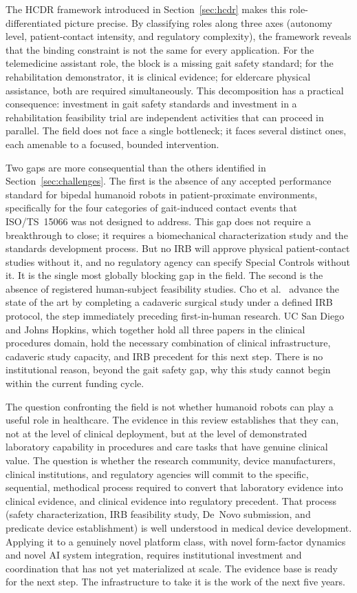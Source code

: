 \documentclass[acmjour]{acmart}
\begin{document}
The HCDR framework introduced in Section~\ref{sec:hcdr} makes this
role-differentiated picture precise. By classifying roles along three axes (autonomy
level, patient-contact intensity, and regulatory complexity), the framework
reveals that the binding constraint is not the same for every application.
For the telemedicine assistant role, the block is a missing gait safety standard;
for the rehabilitation demonstrator, it is clinical evidence; for eldercare
physical assistance, both are required simultaneously. This decomposition has
a practical consequence: investment in gait safety standards and investment in
a rehabilitation feasibility trial are independent activities that can proceed
in parallel. The field does not face a single bottleneck; it faces several
distinct ones, each amenable to a focused, bounded intervention.

Two gaps are more consequential than the others identified in
Section~\ref{sec:challenges}. The first is the absence of any accepted performance
standard for bipedal humanoid robots in patient-proximate environments, specifically
for the four categories of gait-induced contact events that ISO/TS~15066 was not
designed to address. This gap does not require a breakthrough to close; it
requires a biomechanical characterization study and the standards development
process. But no IRB will approve physical patient-contact studies without it, and
no regulatory agency can specify Special Controls without it. It is the single
most globally blocking gap in the field. The second is the absence of registered
human-subject feasibility studies. Cho et al.~\cite{cho2026humanoid} advance the
state of the art by completing a cadaveric surgical study under a defined IRB
protocol, the step immediately preceding first-in-human research. UC San Diego
and Johns Hopkins, which together hold all three papers in the clinical procedures
domain, hold the necessary combination of clinical infrastructure, cadaveric
study capacity, and IRB precedent for this next step. There is no institutional
reason, beyond the gait safety gap, why this study cannot begin within the current
funding cycle.

The question confronting the field is not whether humanoid robots can play a
useful role in healthcare. The evidence in this review establishes that they
can, not at the level of clinical deployment, but at the level of demonstrated
laboratory capability in procedures and care tasks that have genuine clinical
value. The question is whether the research community, device manufacturers,
clinical institutions, and regulatory agencies will commit to the specific,
sequential, methodical process required to convert that laboratory evidence into
clinical evidence, and clinical evidence into regulatory precedent. That
process (safety characterization, IRB feasibility study, De~Novo submission, and
predicate device establishment) is well understood in medical device development.
Applying it to a genuinely novel platform class, with novel form-factor dynamics
and novel AI system integration, requires institutional investment and coordination
that has not yet materialized at scale. The evidence base is ready for the next
step. The infrastructure to take it is the work of the next five years.
\end{document}
